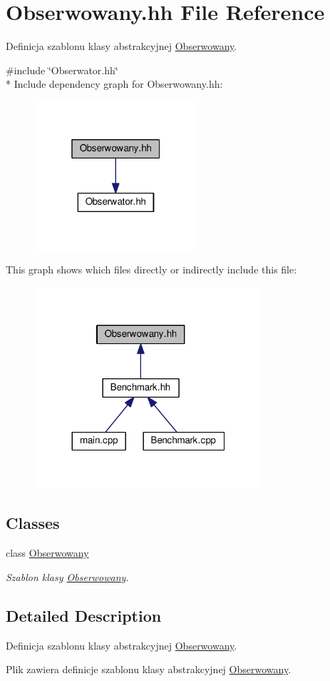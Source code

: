\hypertarget{a00054}{}\section{Obserwowany.\+hh File Reference}
\label{a00054}


Definicja szablonu klasy abstrakcyjnej \hyperlink{a00017}{Obserwowany}.  


{\ttfamily \#include \char`\"{}Obserwator.\+hh\char`\"{}}\\*
Include dependency graph for Obserwowany.\+hh\+:
\nopagebreak
\begin{figure}[H]
\begin{center}
\leavevmode
\includegraphics[width=172pt]{a00109}
\end{center}
\end{figure}
This graph shows which files directly or indirectly include this file\+:
\nopagebreak
\begin{figure}[H]
\begin{center}
\leavevmode
\includegraphics[width=239pt]{a00110}
\end{center}
\end{figure}
\subsection*{Classes}
\begin{DoxyCompactItemize}
\item 
class \hyperlink{a00017}{Obserwowany}
\begin{DoxyCompactList}\small\item\em Szablon klasy \hyperlink{a00017}{Obserwowany}. \end{DoxyCompactList}\end{DoxyCompactItemize}


\subsection{Detailed Description}
Definicja szablonu klasy abstrakcyjnej \hyperlink{a00017}{Obserwowany}. 

Plik zawiera definicje szablonu klasy abstrakcyjnej \hyperlink{a00017}{Obserwowany}. 